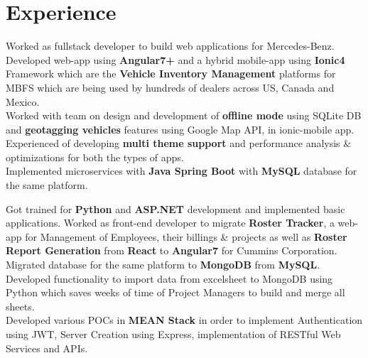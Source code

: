 \documentclass[]{jaydeep-resume-openfont}
\begin{document}
\begin{minipage}[t]{0.70\textwidth}


\section{Experience}

\textbullet{} Worked as fullstack developer to build web applications for Mercedes-Benz. \\
\textbullet{} Developed web-app using \textbf{Angular7+} and a hybrid mobile-app using \textbf{Ionic4} Framework which are the \textbf{Vehicle Inventory Management} platforms for MBFS which are being used by hundreds of dealers across US, Canada and Mexico.\\
\textbullet{} Worked with team on design and development of \textbf{offline mode} using SQLite DB and \textbf{geotagging vehicles} features using Google Map API, in ionic-mobile app. \\
\textbullet{} Experienced of developing \textbf{multi theme support} and performance analysis \& optimizations for both the types of apps. \\
\textbullet{} Implemented microservices with \textbf{Java Spring Boot} with \textbf{MySQL} database for the same platform.
\sectionsep

\textbullet{} Got trained for \textbf{Python} and \textbf{ASP.NET} development and implemented basic applications.
\textbullet{} Worked as front-end developer to migrate \textbf{Roster Tracker}, a web-app for Management of Employees, their billings \& projects as well as \textbf{Roster Report Generation} from \textbf{React} to \textbf{Angular7} for Cummins Corporation. \\
\textbullet{} Migrated database for the same platform to \textbf{MongoDB} from \textbf{MySQL}. \\
\textbullet{} Developed functionality to import data from excelsheet to MongoDB using Python which saves weeks of time of Project Managers to build and merge all sheets. \\
\textbullet{} Developed various POCs in \textbf{MEAN Stack} in order to implement Authentication using JWT, Server Creation using Express, implementation of RESTful Web Services and APIs. \\
\sectionsep


\end{minipage}
\end{document}
